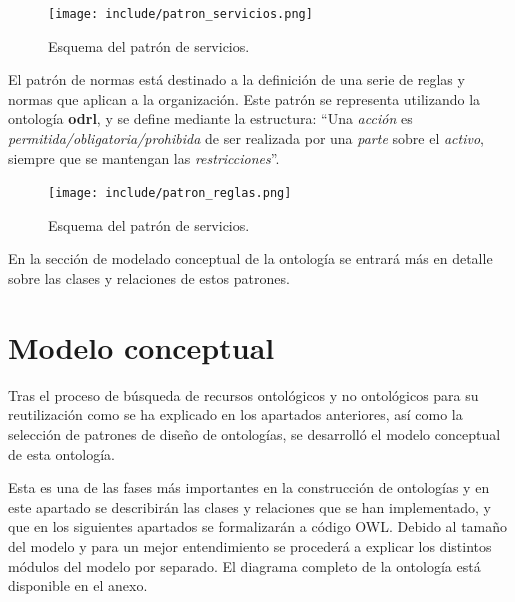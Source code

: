 \documentclass[a4paper,12pt]{article}
\begin{document}
	\begin{figure}[H]
		\centering
		\texttt{[image: include/patron\_servicios.png]}
		\caption{Esquema del patrón de servicios.}
	\end{figure}

	El patrón de normas está destinado a la definición de una serie de reglas y normas que aplican a la organización. Este patrón se representa utilizando la ontología \textbf{odrl}, y se define mediante la estructura: “Una \textit{acción} es \textit{permitida/obligatoria/prohibida} de ser realizada por una \textit{parte} sobre el \textit{activo}, siempre que se mantengan las \textit{restricciones}”.
	
	\begin{figure}[H]
		\centering
		\texttt{[image: include/patron\_reglas.png]}
		\caption{Esquema del patrón de servicios.}
	\end{figure}
	
	En la sección de modelado conceptual de la ontología se entrará más en detalle sobre las clases y relaciones de estos patrones.
	
	\section{Modelo conceptual}
	
	Tras el proceso de búsqueda de recursos ontológicos y no ontológicos para su reutilización como se ha explicado en los apartados anteriores, así como la selección de patrones de diseño de ontologías, se desarrolló el modelo conceptual de esta ontología. 
	
	Esta es una de las fases más importantes en la construcción de ontologías y en este apartado se describirán las clases y relaciones que se han implementado, y que en los siguientes apartados se formalizarán a código OWL. Debido al tamaño del modelo y para un mejor entendimiento se procederá a explicar los distintos módulos del modelo por separado. El diagrama completo de la ontología está disponible en el anexo.
	
\end{document}

